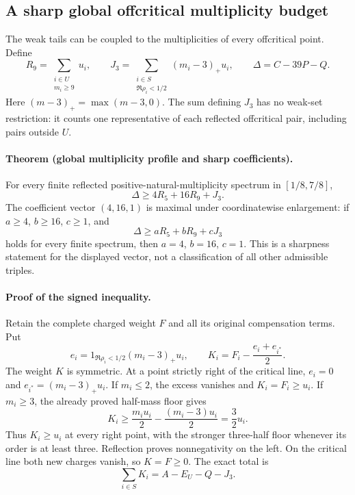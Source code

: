 \subsection{A sharp global offcritical multiplicity budget}
\label{sec:global-offcritical-excess}

The weak tails can be coupled to the multiplicities of every offcritical
point. Define
\[
 R_9=\sum_{\substack{i\in U\\m_i\ge9}}u_i,\qquad
 J_3=\sum_{\substack{i\in S\\\Re\rho_i<1/2}}(m_i-3)_+u_i,
 \qquad \Delta=C-39P-Q.
\]
Here \((m-3)_+=\max(m-3,0)\). The sum defining \(J_3\) has no weak-set
restriction: it counts one representative of each reflected offcritical
pair, including pairs outside \(U\).

\paragraph{Theorem (global multiplicity profile and sharp coefficients).}
For every finite reflected positive-natural-multiplicity spectrum in
\([1/8,7/8]\),
\begin{equation}\label{eq:global-offcritical-excess}
 \boxed{\Delta\ge4R_5+16R_9+J_3.}
\end{equation}
The coefficient vector \((4,16,1)\) is maximal under coordinatewise
enlargement: if \(a\ge4\), \(b\ge16\), \(c\ge1\), and
\[
 \Delta\ge aR_5+bR_9+cJ_3
\]
holds for every finite spectrum, then \(a=4\), \(b=16\), \(c=1\).
This is a sharpness statement for the displayed vector, not a
classification of all other admissible triples.

\paragraph{Proof of the signed inequality.}
Retain the complete charged weight \(F\) and all its original
compensation terms. Put
\[
 e_i=1_{\Re\rho_i<1/2}(m_i-3)_+u_i,\qquad
 K_i=F_i-\frac{e_i+e_{i^*}}2.
\]
The weight \(K\) is symmetric. At a point strictly right of the
critical line, \(e_i=0\) and
\(e_{i^*}=(m_i-3)_+u_i\). If \(m_i\le2\), the excess vanishes and
\(K_i=F_i\ge u_i\). If \(m_i\ge3\), the already proved half-mass
floor gives
\[
 K_i\ge\frac{m_i u_i}{2}-\frac{(m_i-3)u_i}{2}
       =\frac32u_i.
\]
Thus \(K_i\ge u_i\) at every right point, with the stronger
three-half floor whenever its order is at least three. Reflection
proves nonnegativity on the left. On the critical line both new
charges vanish, so \(K=F\ge0\). The exact total is
\[
 \sum_{i\in S}K_i=A-E_U-Q-J_3.
\]

